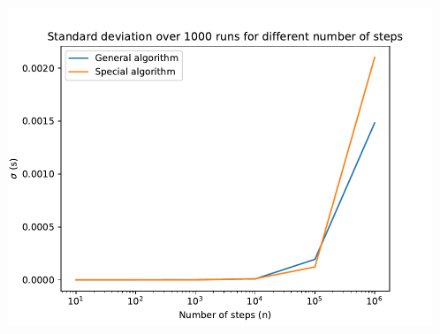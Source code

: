 \documentclass[english,notitlepage]{revtex4-1}  %
\begin{document}
\begin{figure}[H]
  \centering
  \includegraphics[width=.8\textwidth]{../figures/std_time.pdf}
  \caption{}
  \label{fig:std_time}
\end{figure}
\end{document}

